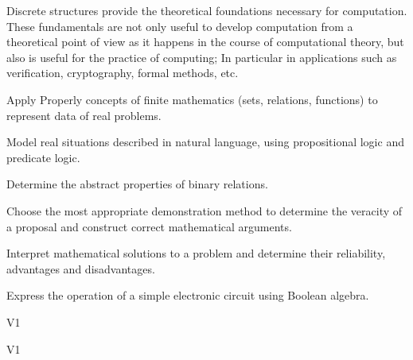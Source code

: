 \begin{syllabus}


\begin{justification}

Discrete structures provide the theoretical foundations necessary for computation. These fundamentals are not only useful to develop computation from a theoretical point of view as it happens 
in the course of computational theory, but also is useful for the practice of computing; In particular in applications such as verification,
cryptography, formal methods, etc.

\end{justification}

\begin{goals}
\item Apply Properly concepts of finite mathematics (sets, relations, functions) to represent data of real problems.
\item Model real situations described in natural language, using propositional logic and predicate logic.
\item Determine the abstract properties of binary relations.
\item Choose the most appropriate demonstration method to determine the veracity of a proposal and construct correct mathematical arguments.
\item Interpret mathematical solutions to a problem and determine their reliability, advantages and disadvantages.
\item Express the operation of a simple electronic circuit using Boolean algebra.
\end{goals}

\begin{outcomes}{V1}
    \item {}
    \item {}
    \item {}
\end{outcomes}

\begin{competences}{V1}
    \item {}
    \item {}
\end{competences}


\end{syllabus}
